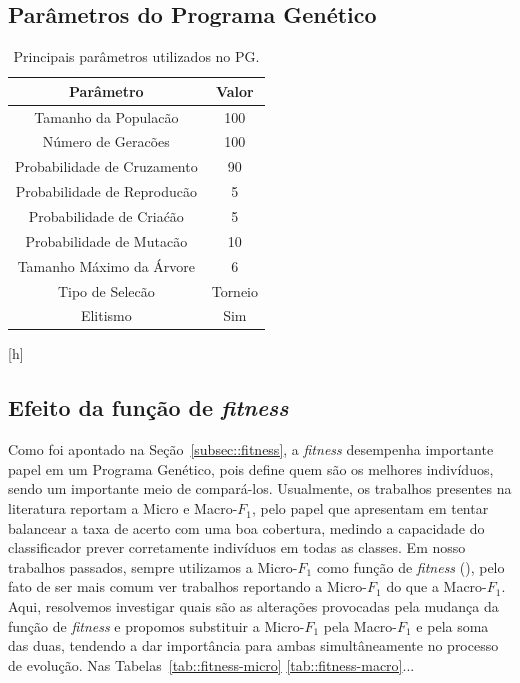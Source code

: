 \subsection{Parâmetros do Programa Genético}


\begin{table}[h]
\centering
\caption{Principais parâmetros utilizados no \textsc{PG}.}
\label{tab::parametros}
\begin{tabular}{|c|c|}
\toprule 
\textbf{Parâmetro} & \textbf{Valor}\tabularnewline
\midrule
Tamanho da Populacão & 100\tabularnewline
\hline 
Número de Geracões & 100\tabularnewline
\hline 
Probabilidade de Cruzamento & 90\tabularnewline
\hline 
Probabilidade de Reproducão & 5\tabularnewline
\hline 
Probabilidade de Cria\'{c}ão & 5\tabularnewline
\hline 
Probabilidade de Mutacão & 10\tabularnewline
\hline 
Tamanho Máximo da Árvore & 6\tabularnewline
\hline 
Tipo de Selecão & Torneio\tabularnewline
\hline 
Elitismo & Sim\tabularnewline
\bottomrule
\end{tabular}
\end{table}[h]



\subsection{Efeito da função de \textit{fitness}}
\label{sec::fitness}


Como foi apontado na Seção~\ref{subsec::fitness}, a \textit{fitness} desempenha importante papel em um Programa Genético, pois define quem são os melhores indivíduos, sendo um importante meio de compará-los.
Usualmente, os trabalhos presentes na literatura reportam a Micro e Macro-$F_1$, pelo papel que apresentam em tentar balancear a taxa de acerto com uma boa cobertura, medindo a capacidade do classificador prever corretamente indivíduos em todas as classes.
Em nosso trabalhos passados, sempre utilizamos a Micro-$F_1$ como função de \textit{fitness} (), pelo fato de ser mais comum ver trabalhos reportando a Micro-$F_1$ do que a Macro-$F_1$. Aqui, resolvemos investigar quais são as alterações provocadas pela mudança da função de \textit{fitness} e propomos substituir a Micro-$F_1$ pela Macro-$F_1$ e pela soma das duas, tendendo a dar importância para ambas simultâneamente no processo de evolução.
Nas Tabelas~\ref{tab::fitness-micro} \ref{tab::fitness-macro}... 

